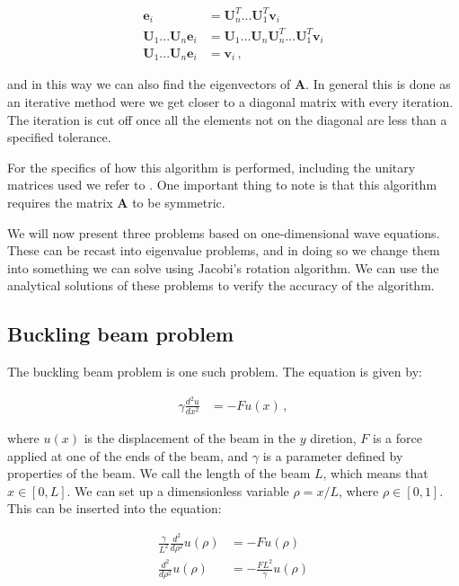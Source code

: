 \documentclass[reprint,english,notitlepage]{revtex4-1}  %
\begin{document}
\begin{align*}
\textbf{e}_i &= \textbf{U}_n^T ... \textbf{U}_1^T \textbf{v}_i \\
\textbf{U}_1 ... \textbf{U}_n \textbf{e}_i &= \textbf{U}_1 ... \textbf{U}_n \textbf{U}_n^T ... \textbf{U}_1^T \textbf{v}_i \\
\textbf{U}_1 ... \textbf{U}_n \textbf{e}_i &= \textbf{v}_i \, ,
\end{align*}

and in this way we can also find the eigenvectors of \textbf{A}. In general this is done as an iterative method were we get closer to a diagonal matrix with every iteration. The iteration is cut off once all the elements not on the diagonal are less than a specified tolerance.

For the specifics of how this algorithm is performed, including the unitary matrices used we refer to \citep{Hjorth-Jensen2015}. One important thing to note is that this algorithm requires the matrix \textbf{A} to be symmetric.

We will now present three problems based on one-dimensional wave equations. These can be recast into eigenvalue problems, and in doing so we change them into something we can solve using Jacobi's rotation algorithm. We can use the analytical solutions of these problems to verify the accuracy of the algorithm.


\subsection{Buckling beam problem} \label{sec:II:c}

The buckling beam problem is one such problem. The equation is given by:

\begin{align*}
\gamma \frac{d^2 u }{dx^2} &= -Fu(x) \, ,
\end{align*}

where $u(x)$ is the displacement of the beam in the $y$ diretion, $F$ is a force applied at one of the ends of the beam, and $\gamma$ is a parameter defined by properties of the beam. We call the length of the beam $L$, which means that $x\in [0,L]$. We can set up a dimensionless variable $\rho = x/L$, where $\rho \in [0,1]$. This can be inserted into the equation:

\begin{align*}
\frac{\gamma}{L^2} \frac{d^2  }{d\rho^2} u(\rho) &= -Fu(\rho) \\
\frac{d^2}{d\rho^2} u(\rho) &= -\frac{FL^2}{\gamma} u(\rho)
\end{align*}
\end{document}
